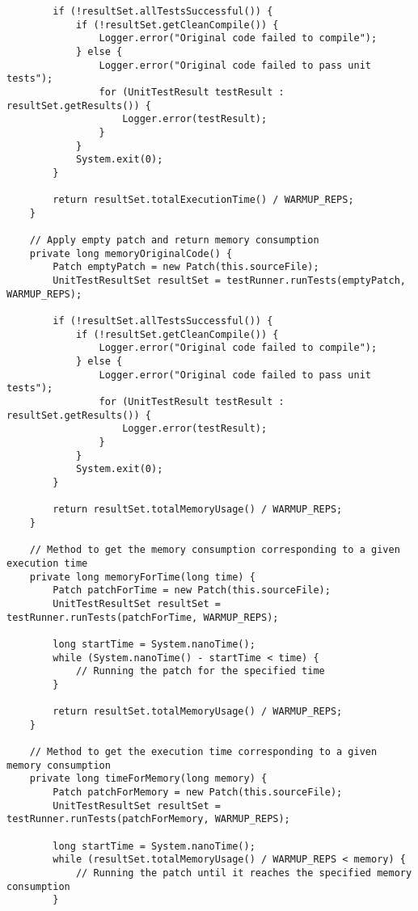 \begin{lstlisting}
        if (!resultSet.allTestsSuccessful()) {
            if (!resultSet.getCleanCompile()) {
                Logger.error("Original code failed to compile");
            } else {
                Logger.error("Original code failed to pass unit tests");
                for (UnitTestResult testResult : resultSet.getResults()) {
                    Logger.error(testResult);
                }
            }
            System.exit(0);
        }

        return resultSet.totalExecutionTime() / WARMUP_REPS;
    }

    // Apply empty patch and return memory consumption
    private long memoryOriginalCode() {
        Patch emptyPatch = new Patch(this.sourceFile);
        UnitTestResultSet resultSet = testRunner.runTests(emptyPatch, WARMUP_REPS);

        if (!resultSet.allTestsSuccessful()) {
            if (!resultSet.getCleanCompile()) {
                Logger.error("Original code failed to compile");
            } else {
                Logger.error("Original code failed to pass unit tests");
                for (UnitTestResult testResult : resultSet.getResults()) {
                    Logger.error(testResult);
                }
            }
            System.exit(0);
        }

        return resultSet.totalMemoryUsage() / WARMUP_REPS;
    }

    // Method to get the memory consumption corresponding to a given execution time
    private long memoryForTime(long time) {
        Patch patchForTime = new Patch(this.sourceFile);
        UnitTestResultSet resultSet = testRunner.runTests(patchForTime, WARMUP_REPS);

        long startTime = System.nanoTime();
        while (System.nanoTime() - startTime < time) {
            // Running the patch for the specified time
        }

        return resultSet.totalMemoryUsage() / WARMUP_REPS;
    }

    // Method to get the execution time corresponding to a given memory consumption
    private long timeForMemory(long memory) {
        Patch patchForMemory = new Patch(this.sourceFile);
        UnitTestResultSet resultSet = testRunner.runTests(patchForMemory, WARMUP_REPS);

        long startTime = System.nanoTime();
        while (resultSet.totalMemoryUsage() / WARMUP_REPS < memory) {
            // Running the patch until it reaches the specified memory consumption
        }


\end{lstlisting}
